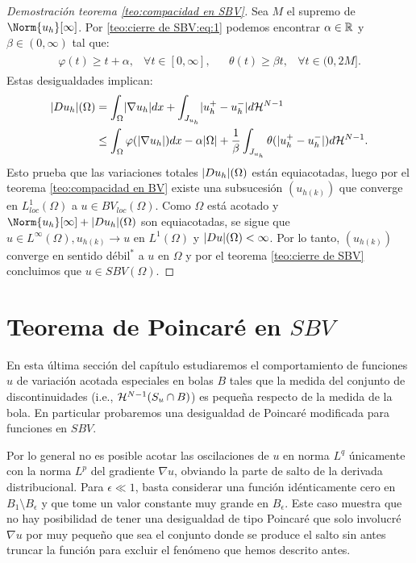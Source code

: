 \documentclass[a4paper,11pt,spanish, twoside, leqno]{tfm-uam}
\begin{document}
\begin{proof}[Demostración teorema \ref{teo:compacidad en SBV}]
Sea $M$ el supremo de $\Norm{u_{h}}[\infty]$. Por \ref{teo:cierre de SBV:eq:1} podemos encontrar $\alpha\in \mathbb{R}$ y $\beta\in (0, \infty)$ tal que:
\begin{align*}
\begin{array}{lllll}
\varphi(t)\geq t+\alpha, &\forall t\in[0,\infty],&& \theta(t)\geq \beta t, & \forall t\in (0,2M].
\end{array}
\end{align*}
Estas desigualdades implican:
\begin{align*}
\lvert Du_{h}\rvert(\Omega)&=\int_{\Omega}\lvert\nabla{u_{h}}\rvert dx+\int_{J_{u_{h}}}\lvert u^{+}_{h}-u^{-}_{h}\rvert d\mathcal{H}^{N-1}
\\&\leq \int_{\Omega} \varphi(\lvert\nabla{u_{h}}\rvert)dx-\alpha\lvert\Omega\rvert+\dfrac{1}{\beta}\int_{J_{u_{h}}}\theta(\lvert u^{+}_{h}-u^{-}_{h}\rvert)d\mathcal{H}^{N-1}.
\end{align*}
Esto prueba que las variaciones totales $\lvert Du_{h}\rvert(\Omega)$ están equiacotadas, luego por el teorema \ref{teo:compacidad en BV} existe una subsucesión $(u_{h(k)})$ que converge en $L^{1}_{loc}(\Omega)$ a $u\in BV_{loc}(\Omega)$. Como $\Omega$ está acotado y $\Norm{u_{h}}[\infty]+\abs{Du_{h}}(\Omega)$ son equiacotadas, se sigue que $u\in L^{\infty}(\Omega), u_{h(k)}\to u$ en $L^{1}(\Omega)$ y $\lvert Du\rvert(\Omega)<\infty$. Por lo tanto, $(u_{h(k)})$ converge en sentido débil$^{*}$ a $u$ en $\Omega$ y por el teorema \ref{teo:cierre de SBV} concluimos que $u\in SBV(\Omega)$.
\end{proof}

\section{Teorema de Poincaré en $SBV$}\label{section:Teorema de Poincaré en SBV}

En esta última sección del capítulo estudiaremos el comportamiento de funciones $u$ de variación acotada especiales en bolas $B$ tales que la medida del conjunto de discontinuidades (i.e., $\mathcal{H}^{N-1}(S_{u}\cap B)$) es pequeña respecto de la medida de la bola. En particular probaremos una desigualdad de Poincaré modificada para funciones en $SBV$. 

Por lo general no es posible acotar las oscilaciones de $u$ en norma $L^{q}$ únicamente con la norma $L^{p}$ del gradiente $\nabla{u}$, obviando la parte de salto de la derivada distribucional. Para $\epsilon\ll 1$, basta considerar una función idénticamente cero en $B_{1}\setminus B_{\epsilon}$ y  que tome un valor constante muy grande en $B_{\epsilon}$. Este caso muestra que no hay posibilidad de tener una desigualdad de tipo Poincaré que solo involucré $\nabla{u}$ por muy pequeño que sea el conjunto donde se produce el salto sin antes truncar la función para excluir el fenómeno que hemos descrito antes.
\end{document}
